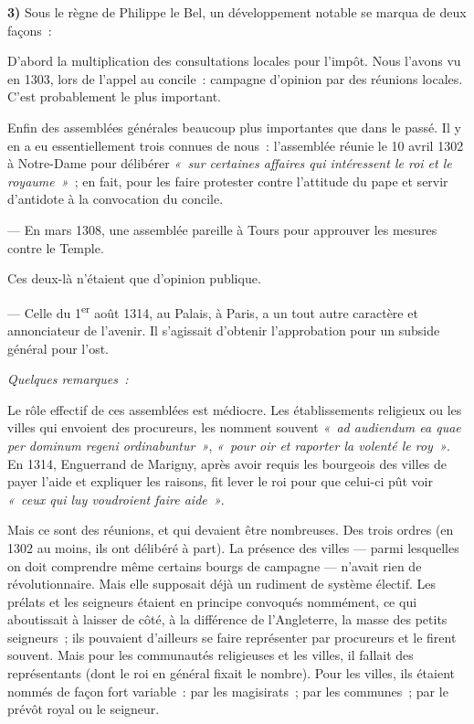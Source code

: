 \documentclass[french,twoside]{book} %
\newlength{\listmod}
\newcommand{\listhead}[1]{\hspace{-1\listmod}\emph{#1}}
\newcommand{\labelchar}[1]{\textbf{\color{rubric} #1}}
\begin{document}
\bigbreak
\noindent \labelchar{3)} Sous le règne de Philippe le Bel, un développement notable se marqua de deux façons :\par
D’abord la multiplication des consultations locales pour l’impôt. Nous l’avons vu en 1303, lors de l’appel au concile : campagne d’opinion par des réunions locales. C’est probablement le plus important.\par
Enfin des assemblées générales beaucoup plus importantes que dans le passé. Il y en a eu essentiellement trois connues de nous :  
\label{p46} l’assemblée réunie le 10 avril 1302 à Notre-Dame pour délibérer \emph{« sur certaines affaires qui intéressent le roi et le royaume »} ; en fait, pour les faire protester contre l’attitude du pape et servir d’antidote à la convocation du concile.\par
— En mars 1308, une assemblée pareille à Tours pour approuver les mesures contre le Temple.\par
Ces deux-là n’étaient que d’opinion publique.\par
— Celle du 1\textsuperscript{er} août 1314, au Palais, à Paris, a un tout autre caractère et annonciateur de l’avenir. Il s’agissait d’obtenir l’approbation pour un subside général pour l’ost.\par

\begin{listalpha}[itemsep=0pt,]
\item[]\listhead{Quelques remarques :}
\item Le rôle effectif de ces assemblées est médiocre. Les établissements religieux ou les villes qui envoient des procureurs, les nomment souvent \emph{« ad audiendum ea quae per dominum regeni ordinabuntur »}, \emph{« pour oir et raporter la volenté le roy »}. En 1314, Enguerrand de Marigny, après avoir requis les bourgeois des villes de payer l’aide et expliquer les raisons, fit lever le roi pour que celui-ci pût voir \emph{« ceux qui luy voudroient faire aide »}.
\item Mais ce sont des réunions, et qui devaient être nombreuses. Des trois ordres (en 1302 au moins, ils ont délibéré à part). La présence des villes — parmi lesquelles on doit comprendre même certains bourgs de campagne — n’avait rien de révolutionnaire. Mais elle supposait déjà un rudiment de système électif. Les prélats et les seigneurs étaient en principe convoqués nommément, ce qui aboutissait à laisser de côté, à la différence de l’Angleterre, la masse des petits seigneurs ; ils pouvaient d’ailleurs se faire représenter par procureurs et le firent souvent. Mais pour les communautés religieuses et les villes, il fallait des représentants (dont le roi en général fixait le nombre). Pour les villes, ils étaient nommés de façon fort variable : par les magisirats ; par les communes ; par le prévôt royal ou le seigneur.
\end{listalpha}
\end{document}

